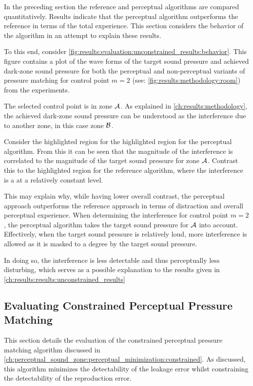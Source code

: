 In the preceding section the reference and perceptual algorithms are compared quantitatively.
Results indicate that the perceptual algorithm outperforms the reference in terms of the total experience.
This section considers the behavior of the algorithm in an attempt to explain these results.

To this end, consider \autoref{fig:results:evaluation:unconstrained_results:behavior}.
This figure contains a plot of the wave forms of the target sound pressure and achieved dark-zone sound pressure 
for both the perceptual and non-perceptual variants of pressure matching for control point $m=2$ 
(see: \autoref{fig:results:methodology:room}) from the experiments.

The selected control point is in zone $\mathcal{A}$. 
As explained in \autoref{ch:results:methodology}, the achieved dark-zone sound pressure can be understood 
as the interference due to another zone, in this case zone $\mathcal{B}$.

Consider the highlighted region for the highlighted region for the perceptual algorithm.
From this it can be seen that the 
magnitude of the interference is correlated to the magnitude of the target sound pressure for zone $\mathcal{A}$.
Contrast this to the highlighted region for the reference algorithm, where the interference is a 
at a relatively constant level.

This may explain why, while having lower overall contrast, the perceptual approach outperforms the 
reference approach in terms of distraction and overall perceptual experience.
When determining the interference for control point $m=2$, the perceptual algorithm takes the 
target sound pressure for $\mathcal{A}$ into account. 
Effectively, when the target sound pressure is relatively loud, more interference is allowed 
as it is masked to a degree by the target sound pressure.

In doing so, the interference is less detectable and thus perceptually less disturbing, 
which serves as a possible explanation to the results given in \autoref{ch:results:results:unconstrained_results}

\subsection{Evaluating Constrained Perceptual Pressure Matching}
\label{ch:results:results:constrained_results}
This section details the evaluation of the constrained perceptual pressure matching algorithm discussed in 
\autoref{ch:perceptual_sound_zone:perceptual_minimization:constrained}.
As discussed, this algorithm minimizes the detectability of the leakage error whilst constraining the detectability of the 
reproduction error.

